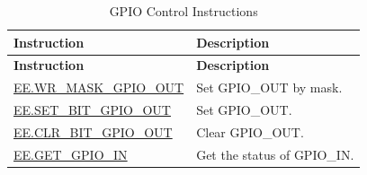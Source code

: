 \begin{longtable}[c]{|l|m{10cm}|}
    \caption{GPIO Control Instructions}
    \label{tab:pie-gpio-instructions}\\
    \hline
    \rowcolor{lightgray}
    \textbf{Instruction} & \textbf{Description} \\\hline
    \endfirsthead
    \rowcolor{lightgray}
    \textbf{Instruction} & \textbf{Description} \\\hline
    \endhead
    
    \endfoot
    
    \hyperref[instruction:EEWRMASKGPIOOUT]{EE.WR\_MASK\_GPIO\_OUT} & Set GPIO\_OUT by mask.
    \\\hline
    \hyperref[instruction:EESETBITGPIOOUT]{EE.SET\_BIT\_GPIO\_OUT} & Set GPIO\_OUT.
    \\\hline
    \hyperref[instruction:EECLRBITGPIOOUT]{EE.CLR\_BIT\_GPIO\_OUT} & Clear GPIO\_OUT.
    \\\hline
    \hyperref[instruction:EEGETGPIOIN]{EE.GET\_GPIO\_IN} & Get the status of GPIO\_IN.
    \\\hline
\end{longtable}
